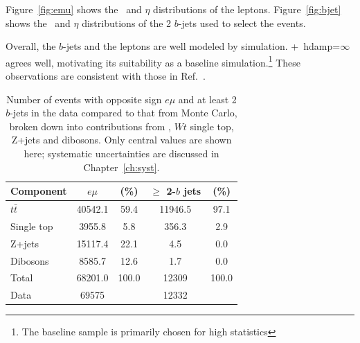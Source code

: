 Figure~\ref{fig:emu} shows the \pt\ and $\eta$ distributions of the leptons. 
Figure~\ref{fig:bjet} shows the \pt\ and $\eta$ distributions of the 2 $b$-jets used to select the events. 

Overall, the $b$-jets and the leptons are well modeled by simulation. \pow+\py\ hdamp=$\infty$ agrees  well, motivating its suitability as a baseline simulation.\footnote{The baseline sample is primarily chosen for high statistics} These observations are consistent with those in Ref.~\cite{xsecnote}.

\begin{table}[htp]
\centering
\begin{tabular}{|l|cc|cc|}\hline
Component & $e\mu$ & (\%) & $\geq$ 2-$b$ jets & (\%) \\ \hline
$t\bar{t}$ 	& 40542.1	& 59.4 	& 11946.5 &	97.1 \\
Single top 	& 3955.8	& 5.8	& 356.3 &	2.9 \\
Z+jets 		& 15117.4 	& 22.1	& 4.5 	&	0.0 \\
Dibosons 	& 8585.7 	& 12.6 	& 1.7	&	0.0 \\
\hline
Total & 68201.0 & 100.0 & 12309	& 100.0 \\
\hline
Data & 69575 &  & 12332 &   \\
\hline \hline 
\end{tabular}
\caption{Number of events with opposite sign $e\mu$ and at least 2 $b$-jets in the data  compared to that from Monte Carlo, broken down into contributions from \ttbar, $Wt$ single top, Z+jets and dibosons. Only central values are shown here;  systematic uncertainties are discussed in Chapter~\ref{ch:syst}.}
\label{t:sel}
\end{table}

